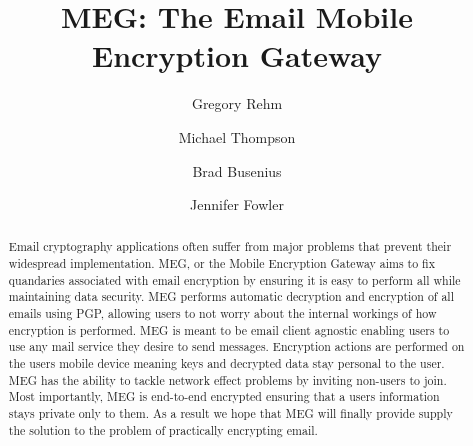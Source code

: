 \documentclass[11pt]{article}
\begin{document}
\title{MEG: The Email Mobile Encryption Gateway}

\author{Gregory Rehm} \author{Michael Thompson} \author{Brad Busenius} \author{Jennifer Fowler}

\date{}

\maketitle

\begin{abstract}
\par Email cryptography applications often suffer from major problems that prevent their widespread implementation. MEG, or the Mobile Encryption Gateway aims to fix quandaries associated with email encryption by ensuring it is easy to perform all while maintaining data security. MEG performs automatic decryption and encryption of all emails using PGP, allowing users to not worry about the internal workings of how encryption is performed. MEG is meant to be email client agnostic enabling users to use any mail service they desire to send messages. Encryption actions are performed on the users mobile device meaning keys and decrypted data stay personal to the user. MEG has the ability to tackle network effect problems by inviting non-users to join. Most importantly, MEG is end-to-end encrypted ensuring that a users information stays private only to them. As a result we hope that MEG will finally provide supply the solution to the problem of practically encrypting email.
\end{abstract}
\doublespacing
\end{document}
